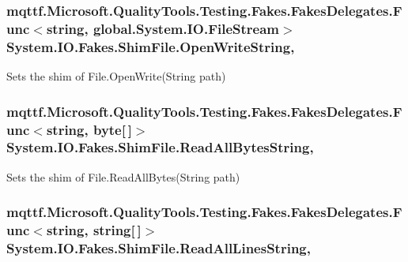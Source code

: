 \hypertarget{class_system_1_1_i_o_1_1_fakes_1_1_shim_file_a81d6b0c88403008f26f0f3946eced0f8}{
\subsubsection[{Open\-Write\-String}]{\setlength{\rightskip}{0pt plus 5cm}mqttf.\-Microsoft.\-Quality\-Tools.\-Testing.\-Fakes.\-Fakes\-Delegates.\-Func$<$string, global.\-System.\-I\-O.\-File\-Stream$>$ System.\-I\-O.\-Fakes.\-Shim\-File.\-Open\-Write\-String\hspace{0.3cm}{\ttfamily [static]}, {\ttfamily [set]}}}\label{class_system_1_1_i_o_1_1_fakes_1_1_shim_file_a81d6b0c88403008f26f0f3946eced0f8}


Sets the shim of File.\-Open\-Write(\-String path)

\hypertarget{class_system_1_1_i_o_1_1_fakes_1_1_shim_file_a4ee21ed009633a9bb64820e446e6cb0a}{
\subsubsection[{Read\-All\-Bytes\-String}]{\setlength{\rightskip}{0pt plus 5cm}mqttf.\-Microsoft.\-Quality\-Tools.\-Testing.\-Fakes.\-Fakes\-Delegates.\-Func$<$string, byte\mbox{[}$\,$\mbox{]}$>$ System.\-I\-O.\-Fakes.\-Shim\-File.\-Read\-All\-Bytes\-String\hspace{0.3cm}{\ttfamily [static]}, {\ttfamily [set]}}}\label{class_system_1_1_i_o_1_1_fakes_1_1_shim_file_a4ee21ed009633a9bb64820e446e6cb0a}


Sets the shim of File.\-Read\-All\-Bytes(\-String path)

\hypertarget{class_system_1_1_i_o_1_1_fakes_1_1_shim_file_ad19170b31dcbc82659ce10dbaf7b9603}{
\subsubsection[{Read\-All\-Lines\-String}]{\setlength{\rightskip}{0pt plus 5cm}mqttf.\-Microsoft.\-Quality\-Tools.\-Testing.\-Fakes.\-Fakes\-Delegates.\-Func$<$string, string\mbox{[}$\,$\mbox{]}$>$ System.\-I\-O.\-Fakes.\-Shim\-File.\-Read\-All\-Lines\-String\hspace{0.3cm}{\ttfamily [static]}, {\ttfamily [set]}}}\label{class_system_1_1_i_o_1_1_fakes_1_1_shim_file_ad19170b31dcbc82659ce10dbaf7b9603}


